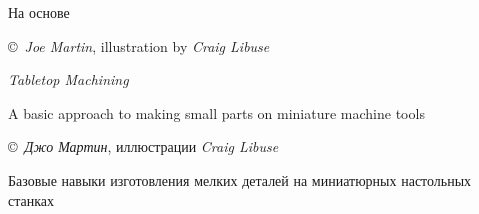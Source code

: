 \label{tabletop}\secdown

На основе \bigskip

\copyright\ \emph{Joe Martin}, illustration by \emph{Craig Libuse}

\emph{Tabletop Machining}

A basic approach to making small parts on miniature machine tools

\bigskip

\copyright\ \emph{Джо Мартин}, иллюстрации \emph{Craig Libuse}

Базовые навыки изготовления мелких деталей на миниатюрных настольных станках

\clearpage

% 
% 
% 
% 
